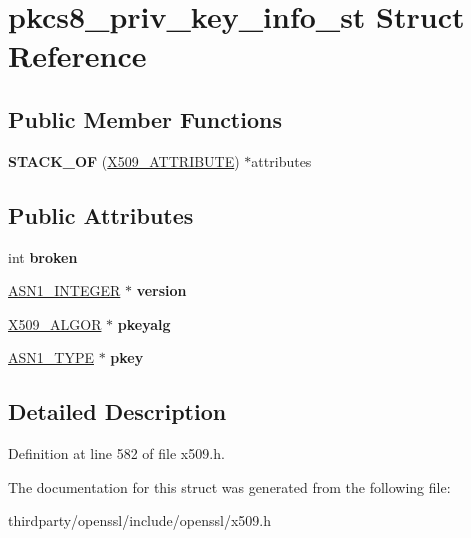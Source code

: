 \hypertarget{structpkcs8__priv__key__info__st}{}\section{pkcs8\+\_\+priv\+\_\+key\+\_\+info\+\_\+st Struct Reference}
\label{structpkcs8__priv__key__info__st}
\subsection*{Public Member Functions}
\begin{DoxyCompactItemize}
\item 
\mbox{\label{structpkcs8__priv__key__info__st_a48e04287be17d39efa8f5c0dc7512851}} 
{\bfseries S\+T\+A\+C\+K\+\_\+\+OF} (\hyperlink{structx509__attributes__st}{X509\+\_\+\+A\+T\+T\+R\+I\+B\+U\+TE}) $\ast$attributes
\end{DoxyCompactItemize}
\subsection*{Public Attributes}
\begin{DoxyCompactItemize}
\item 
\mbox{\label{structpkcs8__priv__key__info__st_a0c1159bfe2a447810dc518175c77c225}} 
int {\bfseries broken}
\item 
\mbox{\label{structpkcs8__priv__key__info__st_a5e3bdcbf50b8971fcb60a8f7d71a36fb}} 
\hyperlink{structasn1__string__st}{A\+S\+N1\+\_\+\+I\+N\+T\+E\+G\+ER} $\ast$ {\bfseries version}
\item 
\mbox{\label{structpkcs8__priv__key__info__st_af94f0f4f185de14be5b0b88bb638b3e8}} 
\hyperlink{struct_x509__algor__st}{X509\+\_\+\+A\+L\+G\+OR} $\ast$ {\bfseries pkeyalg}
\item 
\mbox{\label{structpkcs8__priv__key__info__st_aba8fbcabba1fdcf6ff0f41901a9b042c}} 
\hyperlink{structasn1__type__st}{A\+S\+N1\+\_\+\+T\+Y\+PE} $\ast$ {\bfseries pkey}
\end{DoxyCompactItemize}


\subsection{Detailed Description}


Definition at line 582 of file x509.\+h.



The documentation for this struct was generated from the following file\+:\begin{DoxyCompactItemize}
\item 
thirdparty/openssl/include/openssl/x509.\+h\end{DoxyCompactItemize}
